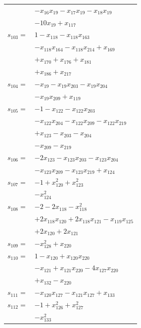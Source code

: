 \begin{longtable}{@{}r@{\;}l@{}}
 & \(\displaystyle -x_{16}x_{19} -x_{17}x_{19} -x_{18}x_{19}\) \\
 & \(\displaystyle -10x_{19} +x_{117}\) \\[3pt]
\(s_{103}=\) & \(\displaystyle 1 -x_{118} -x_{118}x_{163}\) \\
 & \(\displaystyle -x_{118}x_{164} -x_{118}x_{214} +x_{169}\) \\
 & \(\displaystyle +x_{170} +x_{176} +x_{181}\) \\
 & \(\displaystyle +x_{186} +x_{217}\) \\[3pt]
\(s_{104}=\) & \(\displaystyle -x_{19} -x_{19}x_{203} -x_{19}x_{204}\) \\
 & \(\displaystyle -x_{19}x_{209} +x_{119}\) \\[3pt]
\(s_{105}=\) & \(\displaystyle -1 -x_{122} -x_{122}x_{203}\) \\
 & \(\displaystyle -x_{122}x_{204} -x_{122}x_{209} -x_{122}x_{219}\) \\
 & \(\displaystyle +x_{123} -x_{203} -x_{204}\) \\
 & \(\displaystyle -x_{209} -x_{219}\) \\[3pt]
\(s_{106}=\) & \(\displaystyle -2x_{123} -x_{123}x_{203} -x_{123}x_{204}\) \\
 & \(\displaystyle -x_{123}x_{209} -x_{123}x_{219} +x_{124}\) \\[3pt]
\(s_{107}=\) & \(\displaystyle -1 +x_{120}^{2} +x_{123}^{2}\) \\
 & \(\displaystyle -x_{124}^{2}\) \\[3pt]
\(s_{108}=\) & \(\displaystyle -2 -2x_{118} -x_{118}^{2}\) \\
 & \(\displaystyle +2x_{118}x_{120} +2x_{118}x_{121} -x_{119}x_{125}\) \\
 & \(\displaystyle +2x_{120} +2x_{121}\) \\[3pt]
\(s_{109}=\) & \(\displaystyle -x_{128}^{2} +x_{220}\) \\[3pt]
\(s_{110}=\) & \(\displaystyle 1 -x_{120} +x_{120}x_{220}\) \\
 & \(\displaystyle -x_{121} +x_{121}x_{220} -4x_{127}x_{220}\) \\
 & \(\displaystyle +x_{132} -x_{220}\) \\[3pt]
\(s_{111}=\) & \(\displaystyle -x_{120}x_{127} -x_{121}x_{127} +x_{133}\) \\[3pt]
\(s_{112}=\) & \(\displaystyle -1 +x_{126}^{2} +x_{127}^{2}\) \\
 & \(\displaystyle -x_{133}^{2}\) \\[3pt]

\end{longtable}
